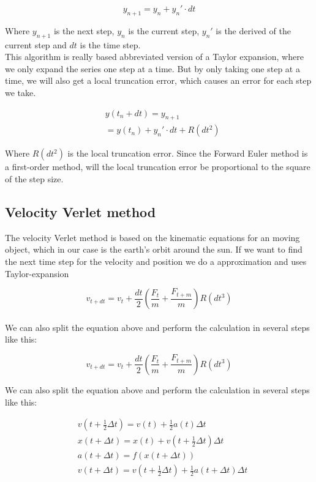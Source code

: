 \documentclass{article}
\begin{document}
\begin{multicols}{2}
\begin{equation}
y_{n+1}=y_n + y_n'\cdot dt
\label{eq:yn1}
\end{equation}

Where $y_{n+1}$ is the next step, $y_n$ is the current step, $y_n'$ is the derived of the current step and $dt$ is the time step.\\
This algorithm is really based abbreviated version of a Taylor expansion, where we only expand the series one step at a time. But by only taking one step at a time, we will also get a local truncation error, which causes an error for each step we take. 

\begin{equation}
\begin{split}
&y(t_n+dt)=y_{n+1}\\
&=y(t_n)+y_n'\cdot dt + R(dt^2)
\end{split}
\label{eq:ytndt}
\end{equation} 

Where $R(dt^2)$ is the local truncation error. Since the Forward Euler method is a first-order method, will the local truncation error be proportional to the square of the step size. 

\subsection{Velocity Verlet method}

The velocity Verlet method is based on the kinematic equations for an moving object, which in our case is the earth's orbit around the sun. If we want to find the next time step for the velocity and position we do a approximation and uses Taylor-expansion   

\begin{equation}
    v_{t+dt}=v_t +\frac{dt}{2}(\frac{F_t}{m}+\frac{F_{t+m}}{m}) R(dt^3)
\end{equation}\\

We can also split the equation above and perform the calculation in several steps like this:

\begin{equation}
v_{t+dt}=v_t +\frac{dt}{2}(\frac{F_t}{m}+\frac{F_{t+m}}{m}) R(dt^3)
\label{eq:steps}
\end{equation}

We can also split the equation above and perform the calculation in several steps like this:

\begin{equation}
\begin{split}
&v(t+\frac{1}{2}\Delta t)=v(t)+\frac{1}{2}a(t)\Delta t\\
&x(t+\Delta t)=x(t)+v(t+\frac{1}{2}\Delta t)\Delta t\\
&a(t+\Delta t)=f(x(t+\Delta t))\\
&v(t+\Delta t)=v(t+\frac{1}{2}\Delta t)+\frac{1}{2}a(t+\Delta t)\Delta t
\end{split}
\label{eq:steps}
\end{equation}
\\
\\
\\


\end{multicols}
\end{document}
